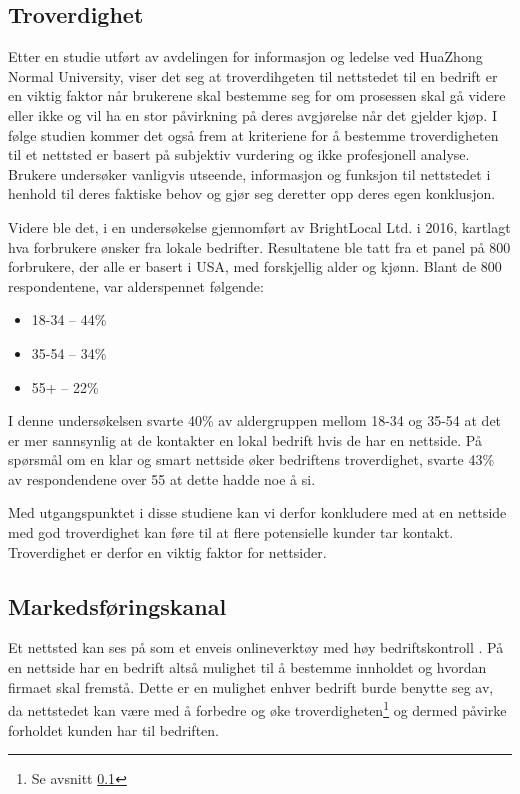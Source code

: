 \subsection{Troverdighet}
\label{sec:analyse-troverdighet}
Etter en studie \cite{zhao2009eew} utført av avdelingen for informasjon og ledelse ved HuaZhong Normal University, viser det seg at troverdihgeten til nettstedet til en bedrift er en viktig faktor når brukerene skal bestemme seg for om prosessen skal gå videre eller ikke og vil ha en stor påvirkning på deres avgjørelse når det gjelder kjøp. I følge studien kommer det også frem at kriteriene for å bestemme troverdigheten til et nettsted er basert på subjektiv vurdering og ikke profesjonell analyse. Brukere undersøker vanligvis utseende, informasjon og funksjon til nettstedet i henhold til deres faktiske behov og gjør seg deretter opp deres egen konklusjon.


Videre ble det, i en undersøkelse \cite{marchant18wdc} gjennomført av BrightLocal Ltd. i 2016, kartlagt hva forbrukere ønsker fra lokale bedrifter. Resultatene ble tatt fra et panel på 800 forbrukere, der alle er basert i USA, med forskjellig alder og kjønn. Blant de 800 respondentene, var alderspennet følgende: 

\begin{itemize}
\item 18-34 – 44\%
\item 35-54 – 34\%
\item 55+ – 22\%
\end{itemize}

I denne undersøkelsen svarte 40\% av aldergruppen mellom 18-34 og 35-54 at det er mer sannsynlig at de kontakter en lokal bedrift hvis de har en nettside. På spørsmål om en klar og smart nettside øker bedriftens troverdighet, svarte 43\% av respondendene over 55 at dette hadde noe å si.

Med utgangspunktet i disse studiene kan vi derfor konkludere med at en nettside med god troverdighet kan føre til at flere potensielle kunder tar kontakt. Troverdighet er derfor en viktig faktor for nettsider.

\subsection{Markedsføringskanal}
Et nettsted kan ses på som et enveis onlineverktøy med høy bedriftskontroll \cite{taiminen2015tuo}. På en nettside har en bedrift altså mulighet til å bestemme innholdet og hvordan firmaet skal fremstå. Dette er en mulighet enhver bedrift burde benytte seg av, da nettstedet kan være med å forbedre og øke troverdigheten\footnote{Se avsnitt \ref{sec:analyse-troverdighet}} og dermed påvirke forholdet kunden har til bedriften.


